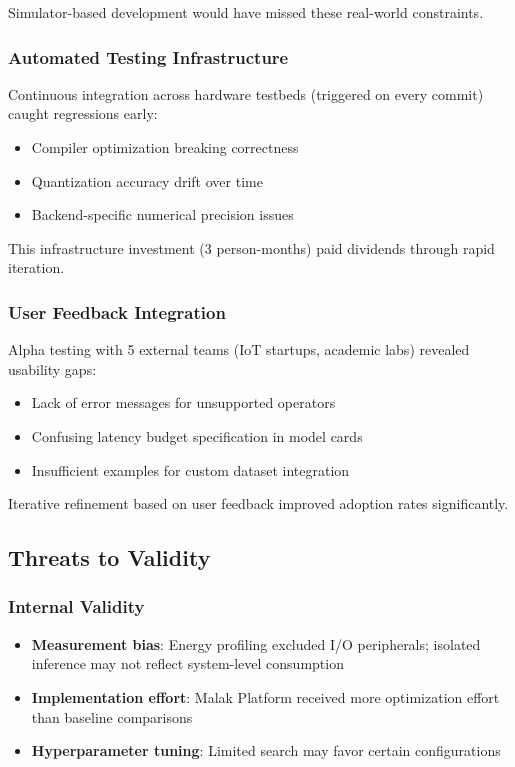 Simulator-based development would have missed these real-world constraints.

\subsubsection{Automated Testing Infrastructure}
Continuous integration across hardware testbeds (triggered on every commit) caught regressions early:
\begin{itemize}
\item Compiler optimization breaking correctness
\item Quantization accuracy drift over time
\item Backend-specific numerical precision issues
\end{itemize}

This infrastructure investment (3 person-months) paid dividends through rapid iteration.

\subsubsection{User Feedback Integration}
Alpha testing with 5 external teams (IoT startups, academic labs) revealed usability gaps:
\begin{itemize}
\item Lack of error messages for unsupported operators
\item Confusing latency budget specification in model cards
\item Insufficient examples for custom dataset integration
\end{itemize}

Iterative refinement based on user feedback improved adoption rates significantly.

\subsection{Threats to Validity}

\subsubsection{Internal Validity}
\begin{itemize}
\item \textbf{Measurement bias}: Energy profiling excluded I/O peripherals; isolated inference may not reflect system-level consumption
\item \textbf{Implementation effort}: Malak Platform received more optimization effort than baseline comparisons
\item \textbf{Hyperparameter tuning}: Limited search may favor certain configurations
\end{itemize}

